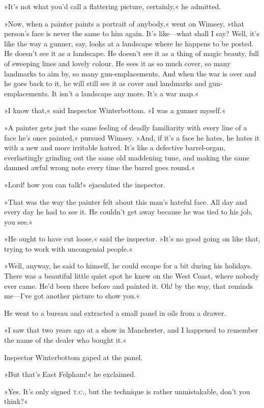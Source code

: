 »It's not what you'd call a flattering picture, certainly,« he admitted.

»Now, when a painter paints a portrait of anybody,« went on Wimsey, »that person's face is never the same to him again. It's like—what shall I say? Well, it's like the way a gunner, say, looks at a landscape where he happens to be posted. He doesn't see it as a landscape. He doesn't see it as a thing of magic beauty, full of sweeping lines and lovely colour. He sees it as so much cover, so many landmarks to aim by, so many gun-emplacements. And when the war is over and he goes back to it, he will still see it as cover and landmarks and gun-emplacements. It isn't a landscape any more. It's a war map.«

»I know that,« said Inspector Winterbottom. »I was a gunner myself.«

»A painter gets just the same feeling of deadly familiarity with every line of a face he's once painted,« pursued Wimsey. »And, if it's a face he hates, he hates it with a new and more irritable hatred. It's like a defective barrel-organ, everlastingly grinding out the same old maddening tune, and making the same damned awful wrong note every time the barrel goes round.«

»Lord! how you can talk!« ejaculated the inspector.

»That was the way the painter felt about this man's hateful face. All day and every day he had to see it. He couldn't get away because he was tied to his job, you see.«

»He ought to have cut loose,« said the inspector. »It's no good going on like that, trying to work with uncongenial people.«

»Well, anyway, he said to himself, he could escape for a bit during his holidays. There was a beautiful little quiet spot he knew on the West Coast, where nobody ever came. He'd been there before and painted it. Oh! by the way, that reminds me—I've got another picture to show you.«

He went to a bureau and extracted a small panel in oils from a drawer.

»I saw that two years ago at a show in Manchester, and I happened to remember the name of the dealer who bought it.«

Inspector Winterbottom gaped at the panel.

»But that's East Felpham!« he exclaimed.

»Yes. It's only signed \textsc{t.c.}, but the technique is rather unmistakable, don't you think?«

